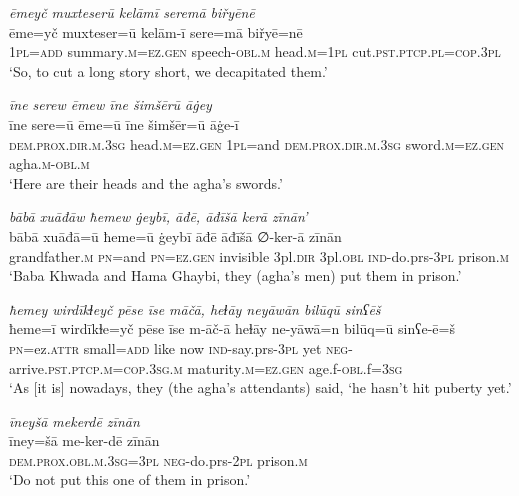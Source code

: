 \ea \label{BP.127}
\textit{ēmeyč muxteserū kelāmī seremā biřyēnē} \\ 
\gll ēme=yč muxteser=ū kelām-ī sere=mā biřyē=nē \\ 
 \textsc{1pl}\textsc{=add} summary\textsc{.m}\textsc{=ez.gen} speech\textsc{-obl}\textsc{.m} head\textsc{.m}\textsc{=\textsc{1pl}} cut\textsc{.pst}\textsc{.ptcp}\textsc{.pl}\textsc{=cop}\textsc{.3pl} \\ 
\glt `So, to cut a long story short, we decapitated them.'
\z 
 
\ea \label{BP.128}
\textit{īne serew ēmew īne šimšērū āġey} \\ 
\gll īne sere=ū ēme=ū īne šimšēr=ū āġe-ī \\ 
 \textsc{dem.prox}\textsc{.dir}\textsc{.m}\textsc{.3sg} head\textsc{.m}\textsc{=ez.gen} \textsc{1pl}=and \textsc{dem.prox}\textsc{.dir}\textsc{.m}\textsc{.3sg} sword\textsc{.m}\textsc{=ez.gen} agha\textsc{.m}\textsc{-obl}\textsc{.m} \\ 
\glt `Here are their heads and the agha’s swords.'
\z 
 
\ea \label{BP.131}
\textit{bābā xuāđāw ħemew ġeybī, āđē, āđīšā kerā zīnān’} \\ 
\gll bābā xuāđā=ū ħeme=ū ġeybī āđē āđīšā ∅-ker-ā zīnān \\ 
 grandfather\textsc{.m} \textsc{pn}=and \textsc{pn}\textsc{=ez.gen} invisible 3pl\textsc{.dir} 3pl\textsc{.obl} \textsc{ind-}do.prs\textsc{-3pl} prison\textsc{.m} \\ 
\glt `Baba Khwada and Hama Ghaybi, they (agha’s men) put them  in prison.'
\z 
 
\ea \label{BP.132}
\textit{ħemey wirdīkɫeyč pēse īse māčā, heɫāy neyāwān bilūqū sinʕēš} \\ 
\gll ħeme=ī wirdīkɫe=yč pēse īse m-āč-ā heɫāy ne-yāwā=n bilūq=ū sinʕe-ē=š \\ 
 \textsc{pn}=ez.\textsc{attr} small\textsc{=add} like now \textsc{ind-}say.prs\textsc{-3pl} yet \textsc{neg-}arrive\textsc{.pst}\textsc{.ptcp}\textsc{.m}\textsc{=cop}\textsc{.3sg}\textsc{.m} maturity\textsc{.m}\textsc{=ez.gen} age.f\textsc{-obl}.f\textsc{=3sg} \\ 
\glt `As [it is] nowadays, they (the agha’s attendants) said, ‘he hasn’t hit puberty yet.'
\z 
 
\ea \label{BP.133}
\textit{īneyšā mekerdē zīnān} \\ 
\gll īney=šā me-ker-dē zīnān \\ 
 \textsc{dem.prox}\textsc{.obl}\textsc{.m}\textsc{.3sg}\textsc{=3pl} \textsc{neg-}do.prs-\textsc{2pl} prison\textsc{.m} \\ 
\glt `Do not put this one of them in prison.'
\z 
 
